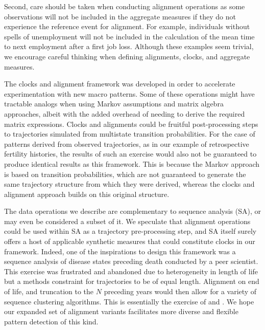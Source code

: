\documentclass[a4paper,left=1.25cm,right=1.25cm,top=1.25cm,bottom=1.25cm]{article}
\begin{document}
Second, care should be taken when conducting alignment operations as some observations will not be included in the aggregate measures if they do not experience the reference event for alignment. For example, individuals without spells of unemployment will not be included in the calculation of the mean time to next employment after a first job loss. Although these examples seem trivial, we encourage careful thinking when defining alignments, clocks, and aggregate measures.

The clocks and alignment framework was developed in order to accelerate experimentation with new macro patterns. Some of these operations might have tractable analogs when using Markov assumptions and matrix algebra approaches, albeit with the added overhead of needing to derive the required matrix expressions. Clocks and alignments could be fruitful post-processing steps to trajectories simulated from multistate transition probabilities. For the case of patterns derived from observed trajectories, as in our example of retrospective fertility histories, the results of such an exercise would also not be guaranteed to produce identical results as this framework. This is because the Markov approach is based on transition probabilities, which are not guaranteed to generate the same trajectory structure from which they were derived, whereas the clocks and alignment approach builds on this original structure. 

The data operations we describe are complementary to sequence analysis (SA), or may even be considered a subset of it. We speculate that alignment operations could be used within SA as a trajectory pre-processing step, and SA itself surely offers a host of applicable synthetic measures that could constitute clocks in our framework. Indeed, one of the inspirations to design this framework was a sequence analysis of disease states preceding death conducted by a peer scientist. This exercise was frustrated and abandoned due to heterogeneity in length of life but a methods constraint for trajectories to be of equal length. Alignment on end of life, and truncation to the $N$ preceding years would then allow for a variety of sequence clustering algorithms. This is essentially the exercise of \citet{potente2018disability} and \citet{raab2018pathways}. We hope our expanded set of alignment variants facilitates more diverse and flexible pattern detection of this kind.
\end{document}
